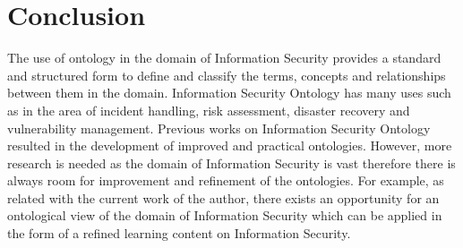 \documentclass[conference, compsoc]{IEEEtran}
\begin{document}
%





\section{Conclusion}
The use of ontology in the domain of Information Security provides a standard and structured form to define and classify the terms, concepts and relationships between them in the domain. Information Security Ontology has many uses such as in the area of incident handling, risk assessment, disaster recovery and vulnerability management. Previous works on Information Security Ontology resulted in the development of improved and practical ontologies. However, more research is needed as the domain of Information Security is vast therefore there is always room for improvement and refinement of the ontologies. For example, as related with the current work of the author, there exists an opportunity for an ontological view of the domain of Information Security which can be applied in the form of a refined learning content on Information Security.
\end{document}
